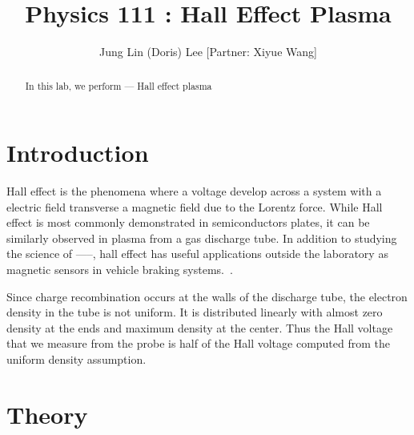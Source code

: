 \documentclass{sigchi}
\def\plaintitle{Physics 111 : Hall Effect Plasma}
\begin{document}
\title{\plaintitle}
\author{Jung Lin (Doris) Lee  [Partner: Xiyue Wang] }
\maketitle
\begin{abstract}
In this lab, we perform --- Hall effect plasma 

\end{abstract}
\section{Introduction}\label{sec:intro}
\par Hall effect is the phenomena where a voltage develop across a system with a electric field transverse a magnetic field due to the Lorentz force.  While Hall effect is most commonly demonstrated in semiconductors plates, it can be similarly observed in plasma from a gas discharge tube.   In addition to studying the science of -----, hall effect has useful applications outside the laboratory as magnetic sensors in vehicle braking systems.~\cite{2_magnetometer_2016}. 
\par 
Since charge recombination occurs at the walls of the discharge tube, the electron density in the tube is not uniform. It is distributed linearly with almost zero density at the ends and maximum density at the center. Thus the Hall voltage that we measure from the probe is half of the Hall voltage computed from the uniform density assumption.


\section{Theory}\label{sec:theory}
\end{document}
